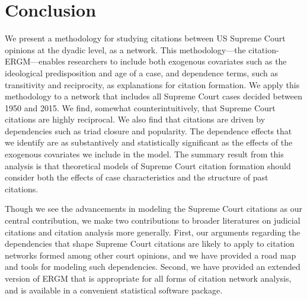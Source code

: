 \documentclass{cup-pan}
\begin{document}
\section{Conclusion}

We present a methodology for studying citations between US Supreme Court opinions at the dyadic level, as a network. This methodology---the citation-ERGM---enables researchers to include both exogenous covariates such as the ideological predisposition and age of a case, and dependence terms, such as transitivity and reciprocity, as explanations for citation formation. We apply this methodology to a network that includes all Supreme Court cases decided between 1950 and 2015. We find, somewhat counterintuitively, that Supreme Court citations are highly reciprocal. We also find that citations are driven by dependencies such as triad closure and popularity. The dependence effects that we identify are as substantively and statistically significant as the effects of the exogenous covariates we include in the model. The summary result from this analysis is that theoretical models of Supreme Court citation formation should consider both the effects of case characteristics and the structure of past citations. 

Though we see the advancements in modeling the Supreme Court citations as our central contribution, we make two contributions to broader literatures on judicial citations and citation analysis more generally. First, our arguments regarding the dependencies that shape Supreme Court citations are likely to apply to citation networks formed among other court opinions, and we have provided a road map and tools for modeling such dependencies. Second, we have provided an extended version of ERGM that is appropriate for all forms of citation network analysis, and is available in a convenient statistical software package.

\printbibliography
\end{document}
